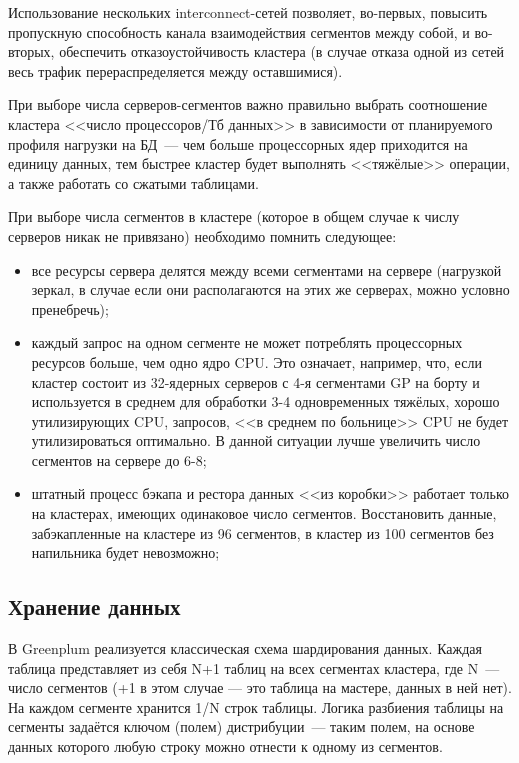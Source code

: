 Использование нескольких interconnect-сетей позволяет, во-первых, повысить пропускную способность канала взаимодействия сегментов между собой, и во-вторых, обеспечить отказоустойчивость кластера (в случае отказа одной из сетей весь трафик перераспределяется между оставшимися).

При выборе числа серверов-сегментов важно правильно выбрать соотношение кластера <<число процессоров/Тб данных>> в зависимости от планируемого профиля нагрузки на БД~--- чем больше процессорных ядер приходится на единицу данных, тем быстрее кластер будет выполнять <<тяжёлые>> операции, а также работать со сжатыми таблицами.

При выборе числа сегментов в кластере (которое в общем случае к числу серверов никак не привязано) необходимо помнить следующее:

\begin{itemize}
  \item все ресурсы сервера делятся между всеми сегментами на сервере (нагрузкой зеркал, в случае если они располагаются на этих же серверах, можно условно пренебречь);
  \item каждый запрос на одном сегменте не может потреблять процессорных ресурсов больше, чем одно ядро CPU. Это означает, например, что, если кластер состоит из 32-ядерных серверов с 4-я сегментами GP на борту и используется в среднем для обработки 3-4 одновременных тяжёлых, хорошо утилизирующих CPU, запросов, <<в среднем по больнице>> CPU не будет утилизироваться оптимально. В данной ситуации лучше увеличить число сегментов на сервере до 6-8;
  \item штатный процесс бэкапа и рестора данных <<из коробки>> работает только на кластерах, имеющих одинаковое число сегментов. Восстановить данные, забэкапленные на кластере из 96 сегментов, в кластер из 100 сегментов без напильника будет невозможно;
\end{itemize}


\subsection{Хранение данных}
\label{subsec:greenplum_data_storage}

В Greenplum реализуется классическая схема шардирования данных. Каждая таблица представляет из себя N+1 таблиц на всех сегментах кластера, где N~--- число сегментов (+1 в этом случае — это таблица на мастере, данных в ней нет). На каждом сегменте хранится 1/N строк таблицы. Логика разбиения таблицы на сегменты задаётся ключом (полем) дистрибуции~--- таким полем, на основе данных которого любую строку можно отнести к одному из сегментов.

